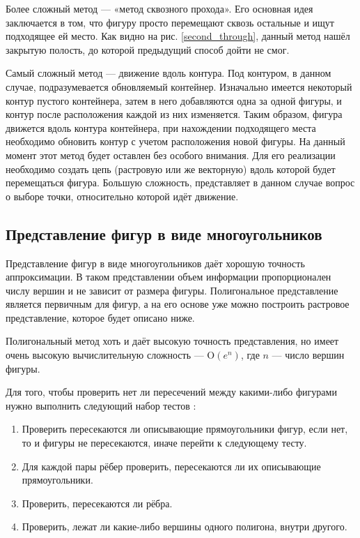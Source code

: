 \documentclass[14pt]{extarticle}
\begin{document}
	Более сложный метод — «метод сквозного прохода». Его основная идея заключается в том, что фигуру просто перемещают сквозь остальные и ищут подходящее ей место. Как 	видно на рис. \ref{second_through}, данный метод нашёл закрытую полость, до которой предыдущий способ дойти не смог.
	


	Самый сложный метод --- движение вдоль контура. Под контуром, в данном случае,
	подразумевается обновляемый контейнер. Изначально имеется некоторый контур пустого контейнера, затем в него добавляются одна за одной фигуры, и контур после расположения каждой из них изменяется. Таким образом, фигура движется вдоль контура контейнера, при нахождении подходящего места необходимо обновить контур с учетом расположения новой фигуры. На данный момент этот метод будет оставлен без особого внимания. Для его реализации необходимо создать цепь (растровую или же векторную) вдоль которой будет перемещаться фигура. Большую сложность, представляет в данном случае вопрос о выборе точки, относительно которой идёт движение.
	\subsection{Представление фигур в виде многоугольников}
	Представление фигур в виде многоугольников даёт хорошую точность аппроксимации. В таком представлении объем информации пропорционален числу вершин и не зависит от размера фигуры. Полигональное представление является первичным для фигур, а на его основе уже можно построить растровое представление, которое будет описано ниже.


	Полигональный метод хоть и даёт высокую точность представления, но имеет очень высокую вычислительную сложность --- $\mathrm{O}(e^n)$, где $n$ --- число вершин фигуры.


	Для того, чтобы проверить нет ли пересечений между какими-либо фигурами нужно
	выполнить следующий набор тестов \cite{Benell_Olivera}:
	\begin{enumerate}
		\item Проверить пересекаются ли описывающие прямоугольники фигур, если нет, то и фигуры не пересекаются, иначе перейти к следующему тесту.
		\item Для каждой пары рёбер проверить, пересекаются ли их описывающие прямоугольники.
		\item Проверить, пересекаются ли рёбра.
		\item Проверить, лежат ли какие-либо вершины одного полигона, внутри другого.
	\end{enumerate}
	
\end{document}
